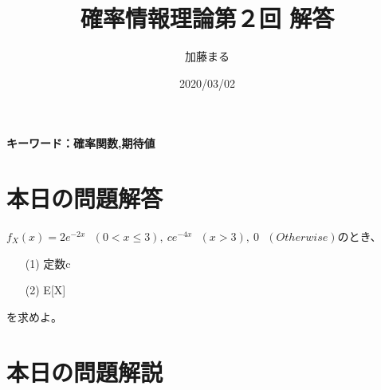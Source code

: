 \documentclass[a4j,uplatex]{jsarticle}
\title{確率情報理論第２回 解答}
\author{加藤まる}
\date{2020/03/02}
\begin{document}
\maketitle
\bf キーワード：確率関数,期待値
\rm

\section*{本日の問題解答}
$f_X(x)=2e^{-2x}~~~(0<x\le 3),~ce^{-4x}~~~(x>3),~0~~~(Otherwise)$のとき、
\begin{itemize}
  \item[(1)] 定数c
  \item[(2)] E[X]  
\end{itemize}
を求めよ。


\section*{本日の問題解説}
\end{document}
